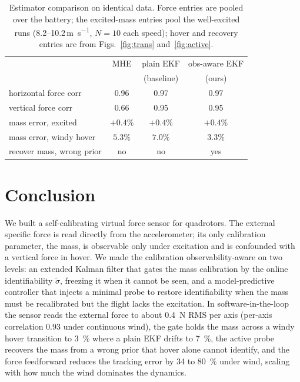 \documentclass{ieeeaccess}
\begin{document}
\begin{table}[t]
\centering
\caption{Estimator comparison on identical data. Force entries are pooled over
the battery; the excited-mass entries pool the well-excited runs
(8.2--10.2\,\si{\meter\per\second}, $N{=}10$ each speed); hover and recovery
entries are from Figs.~\ref{fig:trans} and~\ref{fig:active}.}
\label{tab:compare}
\begin{tabular}{lccc}
\toprule
 & MHE & plain EKF & obs-aware EKF \\
 &     & (baseline) & (ours) \\
\midrule
horizontal force corr      & 0.96 & 0.97 & 0.97 \\
vertical force corr        & 0.66 & 0.95 & 0.95 \\
mass error, excited        & $+0.4\%$ & $+0.4\%$ & $+0.4\%$ \\
mass error, windy hover    & $5.3\%$ & $7.0\%$ & $\mathbf{3.3\%}$ \\
recover mass, wrong prior  & no & no & yes \\
\bottomrule
\end{tabular}
\end{table}

\section{Conclusion}\label{sec:conclusion}

We built a self-calibrating virtual force sensor for quadrotors. The external
specific force is read directly from the accelerometer; its only calibration
parameter, the mass, is observable only under excitation and is confounded with a
vertical force in hover. We made the calibration observability-aware on two levels:
an extended Kalman filter that gates the mass calibration by the online
identifiability $\tilde\sigma$, freezing it when it cannot be seen, and a
model-predictive controller that injects a minimal probe to restore identifiability
when the mass must be recalibrated but the flight lacks the excitation. In
software-in-the-loop the sensor reads the external force to about \SI{0.4}{\newton}
RMS per axis (per-axis correlation \num{0.93} under continuous wind), the gate holds
the mass across a windy hover transition to \SI{3}{\percent} where a plain EKF drifts to
\SI{7}{\percent}, the active probe
recovers the mass from a wrong prior that hover alone cannot identify, and the
force feedforward reduces the tracking error by \SI{34}{} to \SI{80}{\percent}
under wind, scaling with how much the wind dominates the dynamics.
\end{document}
